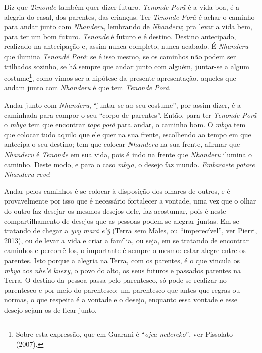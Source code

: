 Diz que \emph{Tenonde} também quer dizer futuro. \emph{Tenonde Porã} é a
vida boa, é a alegria do casal, dos parentes, das crianças. Ter
\emph{Tenonde Porã} é achar o caminho para andar junto com
\emph{Nhanderu}, lembrando de \emph{Nhanderu}; pra levar a vida bem,
para ter um bom futuro. \emph{Tenonde} é futuro e é destino. Destino
antecipado, realizado na antecipação e, assim nunca completo, nunca
acabado. É \emph{Nhanderu} que ilumina \emph{Tenondé Porã}: se é isso
mesmo, se os caminhos não podem ser trilhados sozinho, se há sempre que
andar junto com alguém, juntar-se a algum costume\footnote{Sobre esta
  expressão, que em Guarani é ``\emph{ojea nedereko}'', ver Pissolato
  (2007).}, como vimos ser a hipótese da presente apresentação, aqueles
que andam junto com \emph{Nhanderu} é que tem \emph{Tenonde Porã}.

Andar junto com \emph{Nhanderu}, ``juntar-se ao seu costume'', por assim
dizer, é a caminhada para compor o seu ``corpo de parentes''. Então,
para ter \emph{Tenonde Porã} o \emph{mbya} tem que encontrar \emph{tape
porã} para andar, o caminho bom. O \emph{mbya} tem que colocar tudo
aquilo que ele quer na sua frente, escolhendo ao tempo em que antecipa o
seu destino; tem que colocar \emph{Nhanderu} na sua frente, afirmar que
\emph{Nhanderu} é \emph{Tenonde} em sua vida, pois é indo na frente que
\emph{Nhanderu} ilumina o caminho. Deste modo, e para o caso
\emph{mbya}, o desejo faz mundo. \emph{Embaraete potare Nhanderu
reve}\protect\hypertarget{OLE_LINK31}{}{\protect\hypertarget{OLE_LINK30}{}{}}!

Andar pelos caminhos é se colocar à disposição dos olhares de outros, e
é provavelmente por isso que é necessário fortalecer a vontade, uma vez
que o olhar do outro faz desejar os mesmos desejos dele, faz acostumar,
pois é neste compartilhamento de desejos que as pessoas podem se alegrar
juntas. Em se tratando de chegar a \emph{yvy marã e'ỹ} (Terra sem Males,
ou ``imperecível'', ver Pierri, 2013), ou de levar a vida e criar a
família, ou seja, em se tratando de encontrar caminhos e percorrê-los, o
importante é sempre o mesmo: estar alegre entre os parentes. Isto porque
a alegria na Terra, com os parentes, é o que vincula os \emph{mbya} aos
\emph{nhe'ẽ kuery}, o povo do alto, os seus futuros e passados parentes
na Terra. O destino da pessoa passa pelo parentesco, só pode se realizar
no parentesco e por meio do parentesco; um parentesco que antes que
regras ou normas, o que respeita é a vontade e o desejo, enquanto essa
vontade e esse desejo sejam os de ficar junto.

